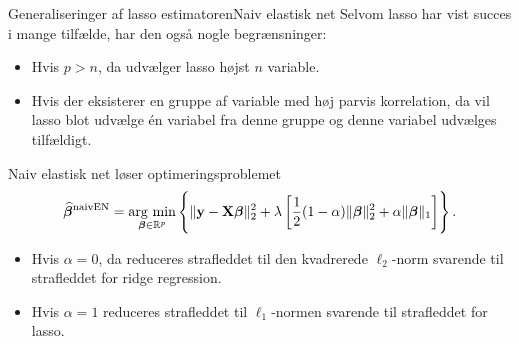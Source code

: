 \begin{frame}{Generaliseringer af lasso estimatoren}{Naiv elastisk net}
Selvom lasso har vist succes i mange tilfælde, har den også nogle begrænsninger:
\begin{itemize}
\item Hvis \(p>n\), da udvælger lasso højst \(n\) variable.
\item Hvis der eksisterer en gruppe af variable med høj parvis korrelation, da vil lasso blot udvælge én variabel fra denne gruppe og denne variabel udvælges tilfældigt.
\end{itemize}

Naiv elastisk net løser optimeringsproblemet
\begin{align*}
\widehat{\boldsymbol{\beta}}^\text{naivEN} =\argmin_{\boldsymbol{\beta} \in \R^p} \cbr{ \Vert \mathbf{y} - \mathbf{X} \boldsymbol{\beta} \Vert_2^2 + \lambda \sbr{\frac{1}{2}(1- \alpha) \Vert \boldsymbol{\beta} \Vert_2^2 + \alpha \Vert \boldsymbol{\beta} \Vert_1}}. 
\end{align*}
\begin{itemize}
\item Hvis $\alpha=0$, da reduceres strafleddet til den kvadrerede $\ell_2$-norm svarende til strafleddet for ridge regression.
\item Hvis $\alpha=1$ reduceres strafleddet til $\ell_1$-normen svarende til strafleddet for lasso.
\end{itemize}
\end{frame}

